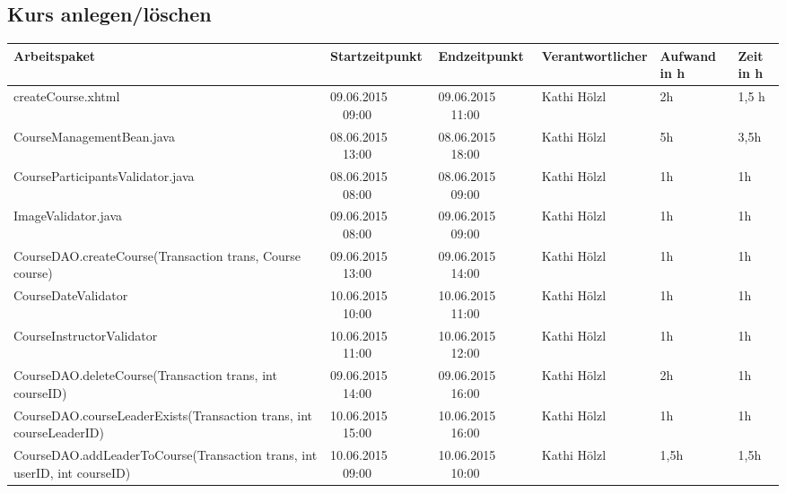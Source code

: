 \begin{landscape}
	\subsection{Kurs anlegen/löschen}
	\begin{tabular}{|p{10.3cm}|p{3.2cm}|p{3.2cm}|p{3.5cm}|p{1.7cm}|p{1.5cm}|}
		\hline  \textbf{Arbeitspaket} & \textbf{Startzeitpunkt} & \textbf{Endzeitpunkt} & \textbf{Verantwortlicher}  & \textbf{Aufwand in h} & \textbf{Zeit in h}\\ 
		\hline   createCourse.xhtml                                    & 09.06.2015 \ \ 09:00     & 09.06.2015 \ \ 11:00     &       Kathi Hölzl & 2h  & 1,5 h\\
		\hline   CourseManagementBean.java                             & 08.06.2015 \ \ 13:00     & 08.06.2015 \ \ 18:00     &      Kathi Hölzl & 5h & 3,5h\\
		\hline   CourseParticipantsValidator.java                        & 08.06.2015 \ \ 08:00     & 08.06.2015 \ \ 09:00           & Kathi Hölzl &      1h    &      1h      \\
		\hline   ImageValidator.java                                   & 09.06.2015 \ \ 08:00     & 09.06.2015 \ \ 09:00      & Kathi Hölzl  &      1h              &      1h    \\
		\hline   CourseDAO.createCourse(Transaction trans, Course course)    & 09.06.2015 \ \ 13:00     & 09.06.2015 \ \ 14:00             & Kathi Hölzl  &      1h       &      1h      \\
		\hline   CourseDateValidator                                         & 10.06.2015 \ \ 10:00     & 10.06.2015 \ \ 11:00           & Kathi Hölzl  &      1h &      1h\\
		\hline   CourseInstructorValidator                                   & 10.06.2015 \ \ 11:00     & 10.06.2015 \ \ 12:00            & Kathi Hölzl  &      1h  &      1h \\
		\hline   CourseDAO.deleteCourse(Transaction trans, int courseID)     & 09.06.2015 \ \ 14:00     & 09.06.2015 \ \ 16:00                & Kathi Hölzl  &      2h   &      1h  \\
		\hline   CourseDAO.courseLeaderExists(Transaction trans, int courseLeaderID)     & 10.06.2015 \ \ 15:00     & 10.06.2015 \ \ 16:00                & Kathi Hölzl  &      1h   &      1h  \\
		\hline   CourseDAO.addLeaderToCourse(Transaction trans, int userID, int courseID)    & 10.06.2015 \ \ 09:00     & 10.06.2015 \ \ 10:00       & Kathi Hölzl &   1,5h&   1,5h\\

\end{tabular}
\end{landscape}
